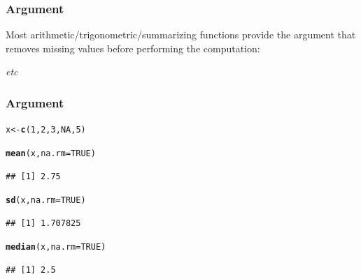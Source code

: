 \documentclass[12pt]{beamer}\usepackage[]{graphicx}\usepackage[]{color}
\makeatletter
\newcommand{\hlnum}[1]{\textcolor[rgb]{0.686,0.059,0.569}{#1}}%
\newcommand{\hlstd}[1]{\textcolor[rgb]{0.345,0.345,0.345}{#1}}%
\newcommand{\hlkwb}[1]{\textcolor[rgb]{0.69,0.353,0.396}{#1}}%
\newcommand{\hlkwc}[1]{\textcolor[rgb]{0.333,0.667,0.333}{#1}}%
\newcommand{\hlkwd}[1]{\textcolor[rgb]{0.737,0.353,0.396}{\textbf{#1}}}%
\newenvironment{kframe}{%
 \def\at@end@of@kframe{}%
 \ifinner\ifhmode%
  \def\at@end@of@kframe{\end{minipage}}%
  \begin{minipage}{\columnwidth}%
 \fi\fi%
 \def\FrameCommand##1{\hskip\@totalleftmargin \hskip-\fboxsep
 \colorbox{shadecolor}{##1}\hskip-\fboxsep
     \hskip-\linewidth \hskip-\@totalleftmargin \hskip\columnwidth}%
 \MakeFramed {\advance\hsize-\width
   \@totalleftmargin\z@ \linewidth\hsize
   \@setminipage}}%
 {\par\unskip\endMakeFramed%
 \at@end@of@kframe}
\newenvironment{knitrout}{}{} %
\makeatother
\begin{document}

\begin{frame}
\frametitle{Argument }

Most arithmetic/trigonometric/summarizing functions provide the argument {\hilit {}} that removes missing values before performing the computation:
\bi
  \item {}
  \item {}
  \item {}
  \item {}
  \item {}
  \item {}
  \item \textit{etc}
\ei

\end{frame}


\begin{frame}[fragile]
\frametitle{Argument }

\begin{knitrout}\footnotesize
{}\color{fgcolor}\begin{kframe}
\begin{alltt}
\hlstd{x} \hlkwb{<-} \hlkwd{c}\hlstd{(}\hlnum{1}\hlstd{,} \hlnum{2}\hlstd{,} \hlnum{3}\hlstd{,} \hlnum{NA}\hlstd{,} \hlnum{5}\hlstd{)}

\hlkwd{mean}\hlstd{(x,} \hlkwc{na.rm} \hlstd{=} \hlnum{TRUE}\hlstd{)}
\end{alltt}
\begin{verbatim}
## [1] 2.75
\end{verbatim}
\begin{alltt}
\hlkwd{sd}\hlstd{(x,} \hlkwc{na.rm} \hlstd{=} \hlnum{TRUE}\hlstd{)}
\end{alltt}
\begin{verbatim}
## [1] 1.707825
\end{verbatim}
\begin{alltt}
\hlkwd{median}\hlstd{(x,} \hlkwc{na.rm} \hlstd{=} \hlnum{TRUE}\hlstd{)}
\end{alltt}
\begin{verbatim}
## [1] 2.5
\end{verbatim}
\end{kframe}
\end{knitrout}

\end{frame}
\end{document}
